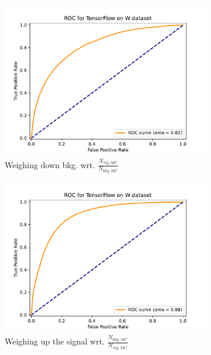 \documentclass[12pt, a4paper]{book}
\begin{document}
\begin{figure}[!ht]
	\centering
	\begin{subfigure}[b]{0.49\textwidth}
         \centering
         \includegraphics[width=1\textwidth]{bkg_MC/ROC.pdf}
         \caption{Weighing down bkg. wrt. $\frac{N_{sig,MC}}{N_{bkg,MC}}$ }
      \end{subfigure}
      \hfill
      \begin{subfigure}[b]{0.49\textwidth}
         \centering
         \includegraphics[width=1\textwidth]{sig_MC/ROC.pdf}
         \caption{Weighing up the signal wrt. $\frac{N_{bkg,MC}}{N_{sig,MC}}$}
      \end{subfigure}
      \hfill
      \begin{subfigure}[b]{0.49\textwidth}

\end{subfigure}
\end{figure}
\end{document}
